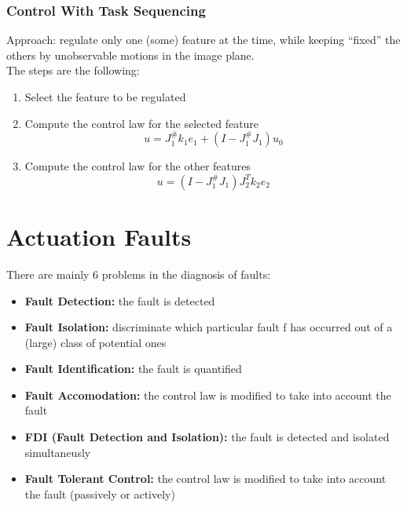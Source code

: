 \documentclass[a4paper,12pt]{article}
\begin{document}
\subsubsection{Control With Task Sequencing}
Approach: regulate only one (some) feature at the time, while keeping
“fixed” the others by unobservable motions in the image plane.\\
The steps are the following:
\begin{enumerate}
    \item Select the feature to be regulated
    \item Compute the control law for the selected feature \begin{equation}
    u=J^{\#}_1k_1e_1+(I-J^{\#}_1J_1)u_0
    \end{equation}
    \item Compute the control law for the other features \begin{equation}
    u=(I-J^{\#}_1J_1)J^T_2k_2e_2
    \end{equation}
\end{enumerate}





\section{Actuation Faults}
There are mainly 6 problems in the diagnosis of faults: \begin{itemize}
\item \textbf{Fault Detection:} the fault is detected
\item \textbf{Fault Isolation:} discriminate which particular fault f 
has occurred out of a (large)
class of potential ones
\item \textbf{Fault Identification:} the fault is quantified
\item \textbf{Fault Accomodation:} the control law is modified to take 
into account the fault
\item \textbf{FDI (Fault Detection and Isolation):} the fault is detected
    and isolated simultaneusly 
\item \textbf{Fault Tolerant Control:} the control law is modified to
    take into account the fault (passively or actively)
\end{itemize}
\end{document}
